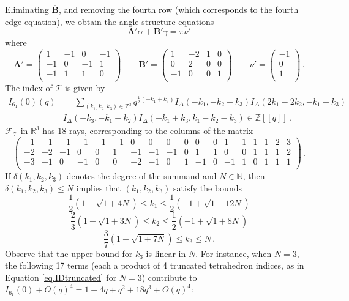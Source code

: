 \documentclass[12pt]{amsart}
\theoremstyle{definition}
\theoremstyle{remark}
\def\BN{\mathbb N}
\def\BZ{\mathbb Z}
\def\BR{\mathbb R}
\def\calF{\mathcal F}
\def\a{\alpha}
\def\d{\delta}
\newcommand{\CT}{\mathcal{T}}
\def\ID{I_{\Delta}}
\newcommand{\mb}{\mathbf}
\begin{document}
Eliminating $\overline{\mb B}$, and removing the fourth row (which corresponds 
to the fourth edge equation), we obtain the angle
structure equations
$$
\mb A' \a + \mb B' \gamma = \pi \nu' 
$$
where
$$
\mb A'=
\left(
\begin{array}{cccc}
 1 & -1 & 0 & -1 \\
 -1 & 0 & -1 & 1 \\
 -1 & 1 & 1 & 0 \\
\end{array}
\right)
\qquad 
\mb B'=
\left(
\begin{array}{cccc}
 1 & -2 & 1 & 0 \\
 0 & 2 & 0 & 0 \\
 -1 & 0 & 0 & 1 \\
\end{array}
\right)
\qquad 
\nu'=
\left(
\begin{array}{c}
 -1 \\
 0 \\
 1 \\
\end{array}
\right) \, .
$$
The index of $\CT$ is given by
\begin{align*}
I_{6_1}(0)(q) &= \sum_{(k_1,k_2,k_3) \in \BZ^3} 
q^{\frac{1}{2} (-k_1 + k_3)}
  \ID(-k_1, -k_2 + k_3) \ID(
  2 k_1 - 2 k_2, -k_1 + k_3) \\
&  \ID(-k_3, -k_1 + k_2) \ID(-k_1 + k_3, 
  k_1 - k_2 - k_3) \in \BZ[[q]] \, .
\end{align*}
$\calF_{\CT}$ in $\BR^3$ has 18 rays, corresponding to the columns of the matrix
$$
\left(
\begin{array}{cccccccccccccccccc}
 -1 & -1 & -1 & -1 & -1 & -1 & 0 & 0 & 0 & 0 & 0 & 0 & 1 & 1 & 1 & 1 & 2 & 3 \\
 -2 & -2 & -1 & 0 & 0 & 1 & -1 & -1 & -1 & 0 & 1 & 1 & 0 & 0 & 1 & 1 & 1 & 2 \\
 -3 & -1 & 0 & -1 & 0 & 0 & -2 & -1 & 0 & 1 & -1 & 0 & -1 & 1 & 0 & 1 & 1 & 1 \\
\end{array}
\right) \, .
$$
If $\d(k_1,k_2,k_3)$ denotes the degree of the summand and 
$N \in \BN$, then $\d(k_1,k_2,k_3) \leq N$ implies that $(k_1,k_2,k_3)$
satisfy the bounds
\begin{equation*}
\frac{1}{2} (1 - \sqrt{1 + 4 N}) \leq k_1  \leq 
\frac{1}{2} (-1 + \sqrt{1 + 12 N}) 
\end{equation*}
\begin{equation*}
\frac{2}{3} (1 - \sqrt{1 + 3 N}) \leq k_2  \leq 
\frac{1}{2} (-1 + \sqrt{1 + 8 N})
\end{equation*}
\begin{equation*}
\frac{3}{7} (1 - \sqrt{1 + 7 N}) \leq k_3  \leq 
N  \, .
\end{equation*}
Observe that the upper bound for $k_3$ is linear in $N$.
For instance, when $N=3$, the following 17 terms 
(each a product of 4 truncated tetrahedron indices, 
as in Equation \eqref{eq.IDtruncated} for $N=3$)
contribute to $I_{6_1}(0)+O(q)^4= 1-4 q+q^2+18 q^3+O(q)^4$: 
\end{document}
